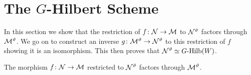 \documentclass{amsart}
\theoremstyle{definition}
\begin{document}
\section{The $G$-Hilbert Scheme}
In this section we show that the restriction of $f \colon \mathcal{N} \rightarrow \mathcal{M}$ to $\mathcal{N}^\vartheta$ factors through $\mathcal{M}^\vartheta$.
We go on to construct an inverse $g \colon \mathcal{M}^\vartheta \rightarrow \mathcal{N}^\vartheta$ to this restriction of $f$ showing it is an isomorphism.
This then proves that $\mathcal{N}^\vartheta \simeq G\text{-Hilb}(W)$.


\begin{proposition}
The morphism $f \colon \mathcal{N} \rightarrow \mathcal{M}$ restricted to $\mathcal{N}^\vartheta$ factors through $\mathcal{M}^\vartheta$.
\end{proposition}
\end{document}
